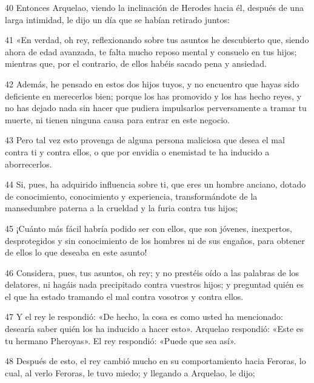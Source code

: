 \par 40 Entonces Arquelao, viendo la inclinación de Herodes hacia él, después de una larga intimidad, le dijo un día que se habían retirado juntos:

\par 41 «En verdad, oh rey, reflexionando sobre tus asuntos he descubierto que, siendo ahora de edad avanzada, te falta mucho reposo mental y consuelo en tus hijos; mientras que, por el contrario, de ellos habéis sacado pena y ansiedad.

\par 42 Además, he pensado en estos dos hijos tuyos, y no encuentro que hayas sido deficiente en merecerlos bien; porque los has promovido y los has hecho reyes, y no has dejado nada sin hacer que pudiera impulsarlos perversamente a tramar tu muerte, ni tienen ninguna causa para entrar en este negocio.

\par 43 Pero tal vez esto provenga de alguna persona maliciosa que desea el mal contra ti y contra ellos, o que por envidia o enemistad te ha inducido a aborrecerlos.

\par 44 Si, pues, ha adquirido influencia sobre ti, que eres un hombre anciano, dotado de conocimiento, conocimiento y experiencia, transformándote de la mansedumbre paterna a la crueldad y la furia contra tus hijos;

\par 45 ¡Cuánto más fácil habría podido ser con ellos, que son jóvenes, inexpertos, desprotegidos y sin conocimiento de los hombres ni de sus engaños, para obtener de ellos lo que deseaba en este asunto!

\par 46 Considera, pues, tus asuntos, oh rey; y no prestéis oído a las palabras de los delatores, ni hagáis nada precipitado contra vuestros hijos; y preguntad quién es el que ha estado tramando el mal contra vosotros y contra ellos.

\par 47 Y el rey le respondió: «De hecho, la cosa es como usted ha mencionado: desearía saber quién los ha inducido a hacer esto». Arquelao respondió: «Este es tu hermano Pheroyas». El rey respondió: «Puede que sea así».

\par 48 Después de esto, el rey cambió mucho en su comportamiento hacia Feroras, lo cual, al verlo Feroras, le tuvo miedo; y llegando a Arquelao, le dijo;

